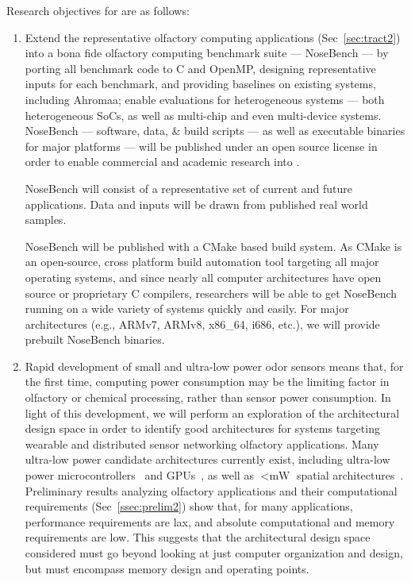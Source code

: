 Research objectives for \olfc{} are as follows:

\begin{enumerate}
\item Extend the representative olfactory computing applications (Sec~\ref{sec:tract2})
    into a bona fide olfactory computing benchmark suite --- NoseBench --- by
    porting all benchmark code to C and OpenMP, designing representative inputs
    for each benchmark, and providing baselines on existing systems, including
    Ahromaa; enable evaluations for heterogeneous systems --- both
    heterogeneous SoCs, as well as multi-chip and even multi-device systems.
    NoseBench --- software, data, \& build scripts --- as well as
    executable binaries for major platforms --- will be published under
    an open source license in order to enable commercial and academic
    research into \olfc{}.

    NoseBench will consist of a representative set of current and future
    \olfc{} applications.  Data and inputs will be drawn from published real
    world samples.
    
    NoseBench will be published with a CMake based build system.  As CMake
    is an open-source, cross platform build automation tool targeting all
    major operating systems, and since nearly all computer architectures
    have open source or proprietary C compilers, researchers will be able
    to get NoseBench running on a wide variety of systems quickly and easily.
    For major architectures (e.g., ARMv7, ARMv8, x86\_64, i686, etc.),
    we will provide prebuilt NoseBench binaries.
\item
    Rapid development of small and ultra-low power odor sensors means that, for
    the first time, computing power consumption may be the limiting factor
    in olfactory or chemical processing, rather than sensor power
    consumption.  In light of this development, we will perform an exploration
    of the architectural design space in order to identify good architectures
    for \olfc{} systems targeting wearable and distributed sensor networking
    olfactory applications.  Many ultra-low power candidate architectures
    currently exist, including ultra-low power microcontrollers~\cite{} and GPUs~\cite{},
    as well as \(<\si{\milli\watt}\) spatial architectures~\cite{}.
    Preliminary results analyzing olfactory applications
    and their computational requirements (Sec~\ref{ssec:prelim2}) show that,
    for many applications, performance requirements are lax, and absolute
    computational and memory requirements are low.  This suggests that the
    architectural design space considered must go beyond looking at just
    computer organization and design, but must encompass memory design and
    operating points.


\end{enumerate}
